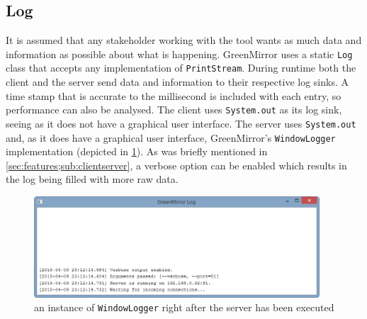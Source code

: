 \subsection{Log}\label{sec:features;sub:log}
It is assumed that any stakeholder working with the tool wants as much data and information as possible about what is happening. GreenMirror uses a static \lstinline{Log} class that accepts any implementation of \lstinline{PrintStream}. During runtime both the client and the server send data and information to their respective log sinks. A time stamp that is accurate to the millisecond is included with each entry, so performance can also be analysed. The client uses \lstinline{System.out} as its log sink, seeing as it does not have a graphical user interface. The server uses \lstinline{System.out} and, as it does have a graphical user interface, GreenMirror's \lstinline{WindowLogger} implementation (depicted in \cref{fig:log}). As was briefly mentioned in \cref{sec:features;sub:clientserver}, a verbose option can be enabled which results in the log being filled with more raw data.
\begin{figure}[h]
  \centering\includegraphics[width=0.95\textwidth]{images/log}
  \caption{an instance of \lstinline{WindowLogger} right after the server has been executed}
  \label{fig:log}
\end{figure}
